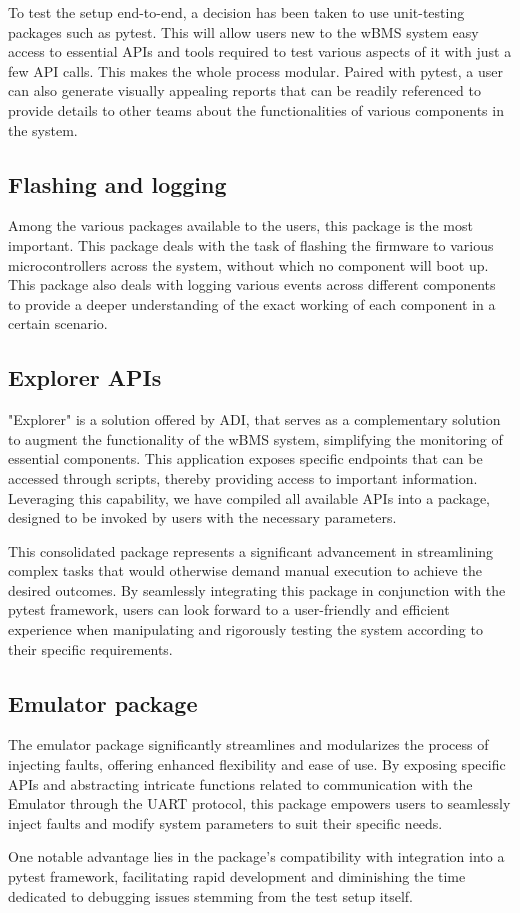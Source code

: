 To test the setup end-to-end, a decision has been taken to use unit-testing packages such as pytest. This will allow users new to the wBMS system easy access to essential APIs and tools required to test various aspects of it with just a few API calls. This makes the whole process modular. Paired with pytest, a user can also generate visually appealing reports that can be readily referenced to provide details to other teams about the functionalities of various components in the system.

\subsection{Flashing and logging}

Among the various packages available to the users, this package is the most important. This package deals with the task of flashing the firmware to various microcontrollers across the system, without which no component will boot up. This package also deals with logging various events across different components to provide a deeper understanding of the exact working of each component in a certain scenario.

\subsection{Explorer APIs}

"Explorer" is a solution offered by ADI, that serves as a complementary solution to augment the functionality of the wBMS system, simplifying the monitoring of essential components. This application exposes specific endpoints that can be accessed through scripts, thereby providing access to important information. Leveraging this capability, we have compiled all available APIs into a package, designed to be invoked by users with the necessary parameters.

This consolidated package represents a significant advancement in streamlining complex tasks that would otherwise demand manual execution to achieve the desired outcomes. By seamlessly integrating this package in conjunction with the pytest framework, users can look forward to a user-friendly and efficient experience when manipulating and rigorously testing the system according to their specific requirements.

\subsection{Emulator package}

The emulator package significantly streamlines and modularizes the process of injecting faults, offering enhanced flexibility and ease of use. By exposing specific APIs and abstracting intricate functions related to communication with the Emulator through the UART protocol, this package empowers users to seamlessly inject faults and modify system parameters to suit their specific needs.

One notable advantage lies in the package's compatibility with integration into a pytest framework, facilitating rapid development and diminishing the time dedicated to debugging issues stemming from the test setup itself.
